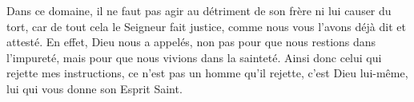 Dans ce domaine, il ne faut pas agir au détriment de son frère ni lui causer du tort,
	car de tout cela le Seigneur fait justice,
	comme nous vous l’avons déjà dit et attesté.
En effet, Dieu nous a appelés, non pas pour que nous restions dans l’impureté,
	mais pour que nous vivions dans la sainteté.
Ainsi donc celui qui rejette mes instructions,
	ce n’est pas un homme qu’il rejette,
	c’est Dieu lui-même, lui qui vous donne son Esprit Saint.
